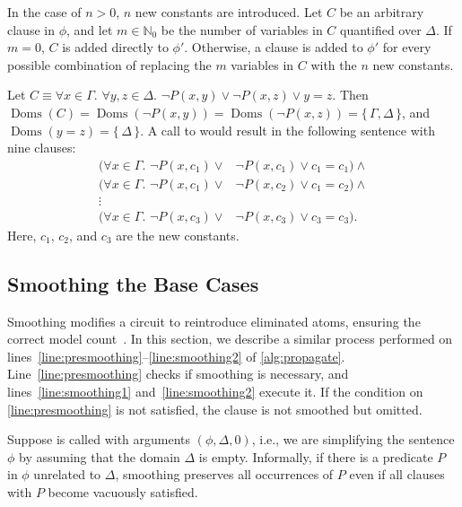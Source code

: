\documentclass[a4paper,UKenglish,cleveref, autoref, thm-restate]{lipics-v2021}
\DeclareMathOperator{\Doms}{Doms}
\begin{document}
In the case of $n>0$, $n$ new constants are introduced. Let $C$ be an arbitrary
clause in $\phi$, and let $m \in \mathbb{N}_{0}$ be the number of variables in
$C$ quantified over $\Delta$. If $m=0$, $C$ is added directly to $\phi'$.
Otherwise, a clause is added to $\phi'$ for every possible combination of
replacing the $m$ variables in $C$ with the $n$ new constants.


\begin{example}
  Let $C \equiv \forall x \in \Gamma\text{. }\forall y, z \in \Delta\text{.
  } \neg P(x, y) \lor \neg P(x, z) \lor y=z$. Then
  $\Doms(C) = \Doms(\neg P(x, y)) = \Doms(\neg P(x, z)) = \{\, \Gamma, \Delta \,\}$,
  and $\Doms(y=z) = \{\, \Delta \,\}$. A call to  would result in the following sentence with nine clauses:
  \begin{align*}
    (\forall x \in \Gamma\text{. }\neg P(x, c_{1}) \lor& \neg P(x, c_{1}) \lor c_{1}=c_{1})\land{}\\
    (\forall x \in \Gamma\text{. }\neg P(x, c_{1}) \lor& \neg P(x, c_{2}) \lor c_{1}=c_{2})\land{}\\
    \vdots&\\
    (\forall x \in \Gamma\text{. }\neg P(x, c_{3}) \lor& \neg P(x, c_{3}) \lor c_{3}=c_{3}).
  \end{align*}
  Here, $c_{1}$, $c_{2}$, and $c_{3}$ are the new constants.
\end{example}

\subsection{Smoothing the Base Cases}\label{sec:smoothing}

Smoothing modifies a circuit to reintroduce eliminated atoms, ensuring the
correct model count~\cite{darwiche2001tractable,DBLP:conf/ijcai/BroeckTMDR11}.
In this section, we describe a similar process performed on
lines~\ref{line:presmoothing}--\ref{line:smoothing2} of \cref{alg:propagate}.
Line~\ref{line:presmoothing} checks if smoothing is necessary, and
lines~\ref{line:smoothing1} and~\ref{line:smoothing2} execute it. If the
condition on \autoref{line:presmoothing} is not satisfied, the clause is not
smoothed but omitted.

Suppose \Propagate is called with arguments $(\phi, \Delta, 0)$, i.e., we are
simplifying the sentence $\phi$ by assuming that the domain $\Delta$ is empty.
Informally, if there is a predicate $P$ in $\phi$ unrelated to $\Delta$,
smoothing preserves all occurrences of $P$ even if all clauses with $P$ become
vacuously satisfied.
\end{document}
